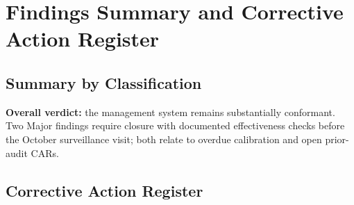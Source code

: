 \section{Findings Summary and Corrective Action Register}

\subsection{Summary by Classification}

\noindent
\begin{minipage}[t]{0.48\linewidth}
\begin{center}
\end{center}
\end{minipage}\hfill
\begin{minipage}[t]{0.48\linewidth}
\begin{sectionbrief}
\textbf{Overall verdict:} the management system remains substantially conformant. Two
Major findings require closure with documented effectiveness checks before the October
surveillance visit; both relate to overdue calibration and open prior-audit CARs.
\end{sectionbrief}
\end{minipage}
\par

\subsection{Corrective Action Register}

